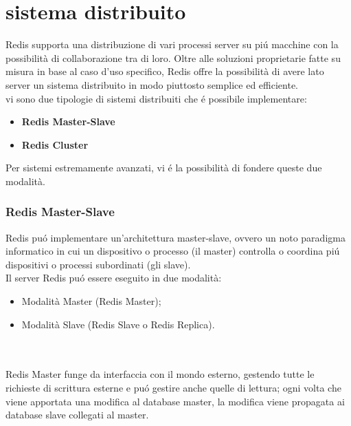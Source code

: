 \section{sistema distribuito}
Redis supporta una distribuzione di vari processi server su piú macchine con la possibilità di collaborazione tra di loro.
Oltre alle soluzioni proprietarie fatte su misura in base al caso d'uso specifico, Redis offre la possibilità di avere lato server un
sistema distribuito in modo piuttosto semplice ed efficiente.\\
vi sono due tipologie di sistemi distribuiti che é possibile implementare:
\begin{itemize}
    \item \textbf{Redis Master-Slave}
    \item \textbf{Redis Cluster}
\end{itemize}
Per sistemi estremamente avanzati, vi é la possibilità di fondere queste due modalità.
\subsubsection{Redis Master-Slave}
Redis puó implementare un'architettura master-slave, ovvero un noto paradigma informatico in cui un dispositivo o processo (il master)
controlla o coordina piú dispositivi o processi subordinati (gli slave).
\\
Il server Redis puó essere eseguito in due modalità:
\begin{itemize}
    \item Modalità Master (Redis Master);
    \item Modalità Slave (Redis Slave o Redis Replica).
\end{itemize}
\\
\\
Redis Master funge da interfaccia con il mondo esterno, gestendo tutte le richieste di scrittura esterne e puó gestire anche
quelle di lettura;
ogni volta che viene apportata una modifica al database master, la modifica viene propagata ai database slave collegati al master.\\

